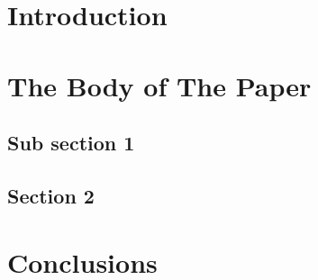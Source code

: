 \documentclass{acm_proc_article-sp}
\begin{document}
%
%
\section{Introduction}

\section{The {\secit Body} of The Paper}

\subsection{Sub section 1}

\subsection{Section 2}

\section{Conclusions}


%
%




%
%
\balancecolumns


%
%
\end{document}

